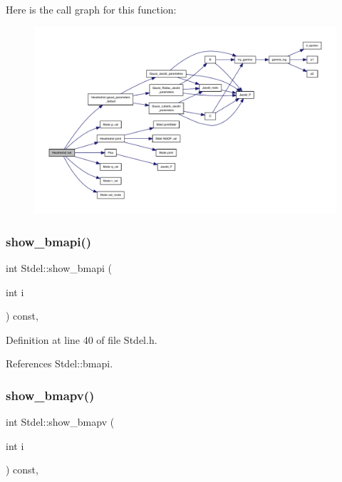 Here is the call graph for this function\+:
\nopagebreak
\begin{figure}[H]
\begin{center}
\leavevmode
\includegraphics[width=350pt]{classHexahedral_aed81c3a2149b36e9bdc0dd67bc5f3bdc_cgraph}
\end{center}
\end{figure}
\mbox{\label{classStdel_ad3a0646ad7ec2567e46da36285dee331}} 
\subsubsection{\texorpdfstring{show\+\_\+bmapi()}{show\_bmapi()}}
{\footnotesize\ttfamily int Stdel\+::show\+\_\+bmapi (\begin{DoxyParamCaption}\item[{int}]{i }\end{DoxyParamCaption}) const\hspace{0.3cm}{\ttfamily [inline]}, {\ttfamily [inherited]}}



Definition at line 40 of file Stdel.\+h.



References Stdel\+::bmapi.

\mbox{\label{classStdel_ac8787dabfb1d767b89e39806522c1161}} 
\subsubsection{\texorpdfstring{show\+\_\+bmapv()}{show\_bmapv()}}
{\footnotesize\ttfamily int Stdel\+::show\+\_\+bmapv (\begin{DoxyParamCaption}\item[{int}]{i }\end{DoxyParamCaption}) const\hspace{0.3cm}{\ttfamily [inline]}, {\ttfamily [inherited]}}




